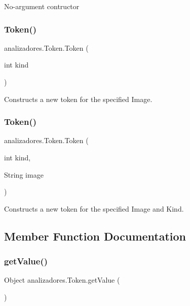 No-\/argument contructor \mbox{\label{classanalizadores_1_1_token_aeb457a7f26dda041155527fecbc475b6}} 
\subsubsection{\texorpdfstring{Token()}{Token()}\hspace{0.1cm}{\footnotesize\ttfamily [2/3]}}
{\footnotesize\ttfamily analizadores.\+Token.\+Token (\begin{DoxyParamCaption}\item[{int}]{kind }\end{DoxyParamCaption})}

Constructs a new token for the specified Image. \mbox{\label{classanalizadores_1_1_token_a7691eebbf98eb55d3c338cb8d7dfccd6}} 
\subsubsection{\texorpdfstring{Token()}{Token()}\hspace{0.1cm}{\footnotesize\ttfamily [3/3]}}
{\footnotesize\ttfamily analizadores.\+Token.\+Token (\begin{DoxyParamCaption}\item[{int}]{kind,  }\item[{String}]{image }\end{DoxyParamCaption})}

Constructs a new token for the specified Image and Kind. 

\subsection{Member Function Documentation}
\mbox{\label{classanalizadores_1_1_token_ac7dec28cd30fc7fe1e678d8aec55008d}} 
\subsubsection{\texorpdfstring{get\+Value()}{getValue()}}
{\footnotesize\ttfamily Object analizadores.\+Token.\+get\+Value (\begin{DoxyParamCaption}{ }\end{DoxyParamCaption})}

